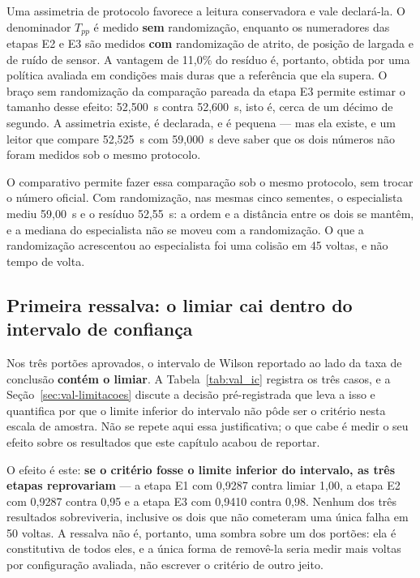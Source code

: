 Uma assimetria de protocolo favorece a leitura conservadora e vale declará-la. O
denominador $T_{pp}$ é medido \textbf{sem} randomização, enquanto os numeradores
das etapas E2 e E3 são medidos \textbf{com} randomização de atrito, de posição de
largada e de ruído de sensor. A vantagem de 11,0\% do resíduo é, portanto, obtida
por uma política avaliada em condições mais duras que a referência que ela supera.
O braço sem randomização da comparação pareada da etapa E3 permite estimar o
tamanho desse efeito: 52,500~s contra 52,600~s, isto é, cerca de um décimo de
segundo. A assimetria existe, é declarada, e é pequena --- mas ela existe, e um
leitor que compare 52,525~s com 59,000~s deve saber que os dois números não foram
medidos sob o mesmo protocolo.

O comparativo permite fazer essa comparação sob o mesmo protocolo, sem trocar o
número oficial. Com randomização, nas mesmas cinco sementes, o especialista
mediu 59,00~s e o resíduo 52,55~s: a ordem e a distância entre os dois se mantêm,
e a mediana do especialista não se moveu com a randomização. O que a
randomização acrescentou ao especialista foi uma colisão em 45 voltas, e não
tempo de volta.

\subsection{Primeira ressalva: o limiar cai dentro do intervalo de confiança}\label{sec:res-ic}

Nos três portões aprovados, o intervalo de Wilson reportado ao lado da taxa de
conclusão \textbf{contém o limiar}. A Tabela~\ref{tab:val_ic} registra os três
casos, e a Seção~\ref{sec:val-limitacoes} discute a decisão pré-registrada que
leva a isso e quantifica por que o limite inferior do intervalo não pôde ser o
critério nesta escala de amostra. Não se repete aqui essa justificativa; o que
cabe é medir o seu efeito sobre os resultados que este capítulo acabou de
reportar.

O efeito é este: \textbf{se o critério fosse o limite inferior do intervalo, as
três etapas reprovariam} --- a etapa E1 com 0,9287 contra limiar 1,00, a etapa E2
com 0,9287 contra 0,95 e a etapa E3 com 0,9410 contra 0,98. Nenhum dos três
resultados sobreviveria, inclusive os dois que não cometeram uma única falha em
50 voltas. A ressalva não é, portanto, uma sombra sobre um dos portões: ela é
constitutiva de todos eles, e a única forma de removê-la seria medir mais voltas
por configuração avaliada, não escrever o critério de outro jeito.

